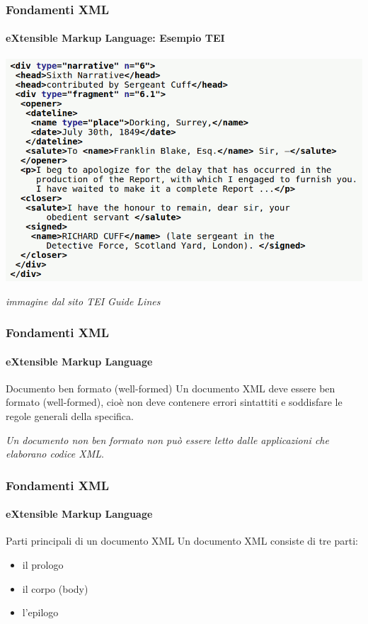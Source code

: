 \begin{frame}
	\frametitle{Fondamenti XML}
	\framesubtitle{eXtensible Markup Language: Esempio TEI}
	\addtocounter{nframe}{1}

	\begin{center}
		\includegraphics[width=.9\textwidth]{imgs/xml-TEI-Example.png}
	\end{center}

	\begin{tiny}
        \textit{immagine dal sito TEI Guide Lines}
    \end{tiny}

\end{frame}


\begin{frame}
	\frametitle{Fondamenti XML}
	\framesubtitle{eXtensible Markup Language}
	\addtocounter{nframe}{1}

	\begin{block}{Documento ben formato (well-formed)}
		Un documento XML deve essere ben formato (well-formed), cioè non deve contenere errori sintattiti e soddisfare le regole generali della specifica.
	\end{block}
	\textit{Un documento non ben formato non può essere letto dalle applicazioni che elaborano codice XML}.

\end{frame}


\begin{frame}
	\frametitle{Fondamenti XML}
	\framesubtitle{eXtensible Markup Language}
	\addtocounter{nframe}{1}

	\begin{block}{Parti principali di un documento XML}
		Un documento XML consiste di tre parti:
		\begin{itemize}
			\item il prologo
			\item il corpo (body)
			\item l'epilogo
		\end{itemize}
	\end{block}

\end{frame}


